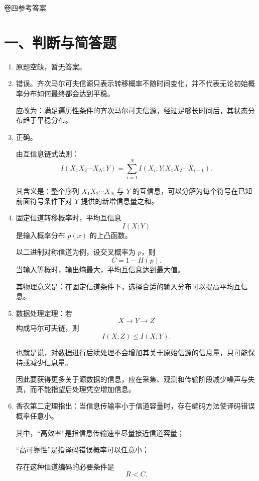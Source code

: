 \documentclass[UTF8,a4paper,12pt]{ctexart}
\begin{document}

\newpage

\begin{center}
{\heiti{} 卷四参考答案}
\end{center}

\section*{一、判断与简答题}

\begin{enumerate}[label=\arabic*., leftmargin=2em]
\item 原题空缺，暂无答案。

\item 错误。齐次马尔可夫信源只表示转移概率不随时间变化，并不代表无论初始概率分布如何最终都会达到平稳。

应改为：满足遍历性条件的齐次马尔可夫信源，经过足够长时间后，其状态分布趋于平稳分布。

\item 正确。

由互信息链式法则：
\[
I(X_1X_2\cdots X_N;Y)
=\sum_{i=1}^{N}I(X_i;Y|X_1X_2\cdots X_{i-1}).
\]

其含义是：整个序列 $X_1X_2\cdots X_N$ 与 $Y$ 的互信息，可以分解为每个符号在已知前面符号条件下对 $Y$ 提供的新增信息量之和。

\item 固定信道转移概率时，平均互信息
\[
I(X;Y)
\]
是输入概率分布 $p(x)$ 的上凸函数。

以二进制对称信道为例，设交叉概率为 $p$，则
\[
C=1-H(p).
\]
当输入等概时，输出熵最大，平均互信息达到最大值。

其物理意义是：在固定信道条件下，选择合适的输入分布可以提高平均互信息。

\item 数据处理定理：若
\[
X\to Y\to Z
\]
构成马尔可夫链，则
\[
I(X;Z)\leq I(X;Y).
\]

也就是说，对数据进行后续处理不会增加其关于原始信源的信息量，只可能保持或减少信息量。

因此要获得更多关于源数据的信息，应在采集、观测和传输阶段减少噪声与失真，而不能指望后处理凭空增加信息。

\item 香农第二定理指出：当信息传输率小于信道容量时，存在编码方法使译码错误概率任意小。

其中，“高效率”是指信息传输速率尽量接近信道容量；

“高可靠性”是指译码错误概率可以任意小；

存在这种信道编码的必要条件是
\[
R<C.
\]
\end{enumerate}
\end{document}

